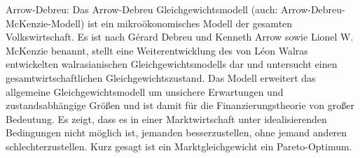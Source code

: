 Arrow-Debreu:
Das Arrow-Debreu Gleichgewichtsmodell (auch: Arrow-Debreu-McKenzie-Modell) ist ein mikroökonomisches Modell der gesamten Volkswirtschaft. Es ist nach Gérard Debreu und Kenneth Arrow sowie Lionel W. McKenzie benannt, stellt eine Weiterentwicklung des von Léon Walras entwickelten walrasianischen Gleichgewichtsmodells dar und untersucht einen gesamtwirtschaftlichen Gleichgewichtszustand. 
Das Modell erweitert das allgemeine Gleichgewichtsmodell um unsichere Erwartungen und zustandsabhängige Größen und ist damit für die Finanzierungstheorie von großer Bedeutung. Es zeigt, dass es in einer Marktwirtschaft unter idealisierenden Bedingungen nicht möglich ist, jemanden besserzustellen, ohne jemand anderen schlechterzustellen. Kurz gesagt ist ein Marktgleichgewicht ein Pareto-Optimum. 


